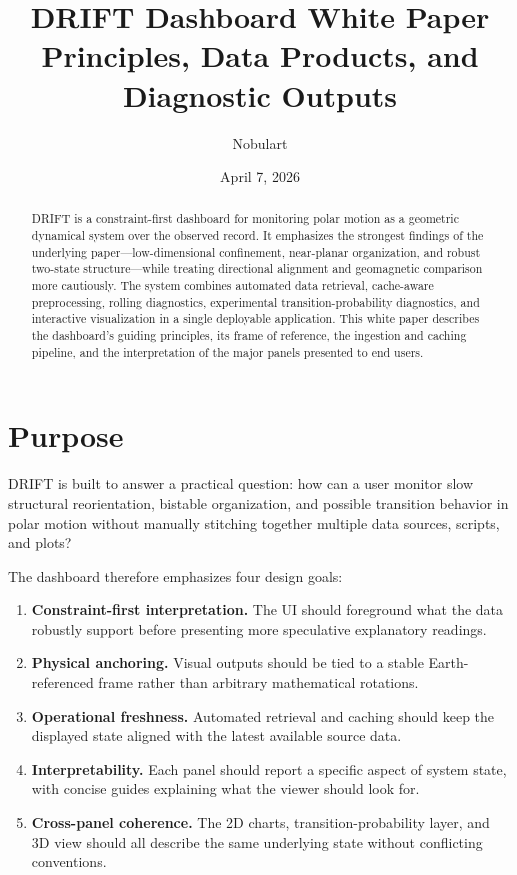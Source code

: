 \documentclass[11pt]{article}
\title{\textbf{DRIFT Dashboard White Paper}\\[0.35em]
\large Principles, Data Products, and Diagnostic Outputs}
\author{Nobulart}
\date{April 7, 2026}
\begin{document}
\maketitle

\begin{abstract}
DRIFT is a constraint-first dashboard for monitoring polar motion as a geometric dynamical system over the observed record. It emphasizes the strongest findings of the underlying paper---low-dimensional confinement, near-planar organization, and robust two-state structure---while treating directional alignment and geomagnetic comparison more cautiously. The system combines automated data retrieval, cache-aware preprocessing, rolling diagnostics, experimental transition-probability diagnostics, and interactive visualization in a single deployable application. This white paper describes the dashboard's guiding principles, its frame of reference, the ingestion and caching pipeline, and the interpretation of the major panels presented to end users.
\end{abstract}

\section{Purpose}
DRIFT is built to answer a practical question: how can a user monitor slow structural reorientation, bistable organization, and possible transition behavior in polar motion without manually stitching together multiple data sources, scripts, and plots?

The dashboard therefore emphasizes four design goals:
\begin{enumerate}[leftmargin=1.5em]
  \item \textbf{Constraint-first interpretation.} The UI should foreground what the data robustly support before presenting more speculative explanatory readings.
  \item \textbf{Physical anchoring.} Visual outputs should be tied to a stable Earth-referenced frame rather than arbitrary mathematical rotations.
  \item \textbf{Operational freshness.} Automated retrieval and caching should keep the displayed state aligned with the latest available source data.
  \item \textbf{Interpretability.} Each panel should report a specific aspect of system state, with concise guides explaining what the viewer should look for.
  \item \textbf{Cross-panel coherence.} The 2D charts, transition-probability layer, and 3D view should all describe the same underlying state without conflicting conventions.
\end{enumerate}
\end{document}
